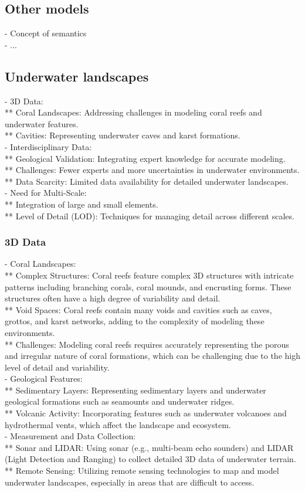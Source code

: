 \subsection{Other models}
- Concept of semantics \\
- ...

\subsection{Underwater landscapes}
- 3D Data: \\
** Coral Landscapes: Addressing challenges in modeling coral reefs and underwater features. \\
** Cavities: Representing underwater caves and karst formations. \\
- Interdisciplinary Data: \\
** Geological Validation: Integrating expert knowledge for accurate modeling. \\
** Challenges: Fewer experts and more uncertainties in underwater environments. \\
** Data Scarcity: Limited data availability for detailed underwater landscapes. \\
- Need for Multi-Scale: \\
** Integration of large and small elements. \\
** Level of Detail (LOD): Techniques for managing detail across different scales.

\subsubsection{3D Data}
- Coral Landscapes: \\
** Complex Structures: Coral reefs feature complex 3D structures with intricate patterns including branching corals, coral mounds, and encrusting forms. These structures often have a high degree of variability and detail. \\
** Void Spaces: Coral reefs contain many voids and cavities such as caves, grottos, and karst networks, adding to the complexity of modeling these environments. \\
** Challenges: Modeling coral reefs requires accurately representing the porous and irregular nature of coral formations, which can be challenging due to the high level of detail and variability. \\
- Geological Features: \\
** Sedimentary Layers: Representing sedimentary layers and underwater geological formations such as seamounts and underwater ridges. \\
** Volcanic Activity: Incorporating features such as underwater volcanoes and hydrothermal vents, which affect the landscape and ecosystem. \\
- Measurement and Data Collection: \\
** Sonar and LIDAR: Using sonar (e.g., multi-beam echo sounders) and LIDAR (Light Detection and Ranging) to collect detailed 3D data of underwater terrain. \\
** Remote Sensing: Utilizing remote sensing technologies to map and model underwater landscapes, especially in areas that are difficult to access.

